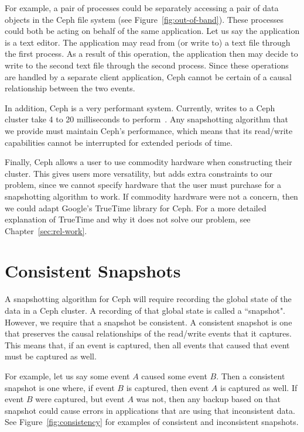 For example, a pair of processes could be separately accessing a pair of
data objects in the Ceph file system (see
Figure~\ref{fig:out-of-band}). These processes could both be acting on
behalf of the same application. Let us say the application is a text
editor. The application may read from (or write to) a text file
through the first process.  As a result of this operation, the
application then may decide to write to the second text file through
the second process. Since these operations are handled by a separate
client application, Ceph cannot be certain of a causal relationship between the
two events.

In addition, Ceph is a very performant system. Currently, writes to a
Ceph cluster take 4 to 20 milliseconds to perform~\citep{Sage}. Any
snapshotting algorithm that we provide must maintain Ceph's performance, which means
that its read/write capabilities cannot be interrupted for extended
periods of time.

Finally, Ceph allows a user to use commodity hardware when
constructing their cluster. This gives users more versatility, but
adds extra constraints to our problem, since we cannot specify
hardware that the user must purchase for a snapshotting algorithm to work. If commodity 
hardware were not a concern, then we could adapt Google's TrueTime library for 
Ceph. For a more detailed explanation of TrueTime
and why it does not solve our problem, see Chapter~\ref{sec:rel-work}.

\section{Consistent Snapshots}

A snapshotting algorithm for Ceph will require recording the global state of the 
data in a Ceph cluster. A recording of that global state is called a 
``snapshot". However, we require that a snapshot be consistent. 
A consistent snapshot is one that preserves the causal relationships 
of the read/write events that it captures. This means that, if an 
event is captured, then all events that caused that 
event must be captured as well. 

For example, let us say some event $A$ caused some event $B$. 
Then a consistent snapshot 
is one where, if event $B$ is captured, then event $A$ is captured as well. If
event $B$ were captured, but event $A$ was not, then any backup based on that
snapshot could cause errors in applications that are using that inconsistent
data. See Figure~\ref{fig:consistency} for examples of consistent and 
inconsistent snapshots.

